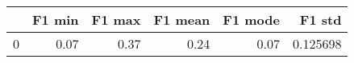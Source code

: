 \begin{tabular}{lrrrrr}
\toprule
{} &  F1 min &  F1 max &  F1 mean &  F1 mode &    F1 std \\
\midrule
0 &    0.07 &    0.37 &     0.24 &     0.07 &  0.125698 \\
\bottomrule
\end{tabular}
